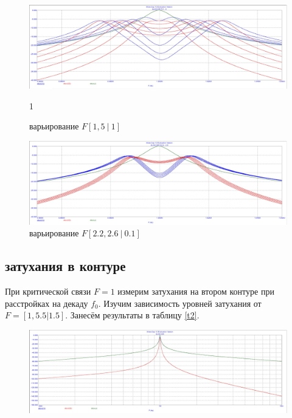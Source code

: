 \documentclass[a4paper, 14pt]{extarticle}%
\begin{document}
\begin{figure}[h!]
	\centering
			\includegraphics[width=1.1\linewidth]{1.7varF.jpg}
            \caption{варьирование $F [1, 5 \: | \: 1]$}
	\label{A}1
\end{figure}


\begin{figure}[h!]
	\centering
			\includegraphics[width=1.1\linewidth]{1.7varF2.jpg}
            \caption{варьирование $F [2.2, 2.6 \: | \: 0.1]$}
	\label{A}
\end{figure}



\subsection{затухания в контуре}
При критической связи $F = 1$ измерим затухания на втором контуре при расстройках на декаду $f_0$. Изучим зависимость уровней затухания от $F = [1,5.5|1.5]$. Занесём результаты в таблицу \ref{t2}.

\begin{figure}[h!]
	\centering
			\includegraphics[width=1.1\linewidth]{1.8.jpg}
	\label{A}
\end{figure}
\end{document}
